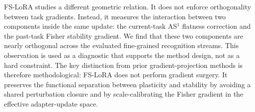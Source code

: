FS-LoRA studies a different geometric relation.
It does not enforce orthogonality between task gradients.
Instead, it measures the interaction between two components inside the same update: the current-task AS$^1$ flatness correction and the past-task Fisher stability gradient.
We find that these two components are nearly orthogonal across the evaluated fine-grained recognition streams.
This observation is used as a diagnostic that supports the method design, not as a hard constraint.
The key distinction from prior gradient-projection methods is therefore methodological: FS-LoRA does not perform gradient surgery.
It preserves the functional separation between plasticity and stability by avoiding a shared perturbation closure and by scale-calibrating the Fisher gradient in the effective adapter-update space.